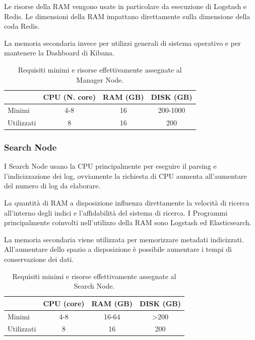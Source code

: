 Le risorse della RAM vengono usate in particolare da esecuzione di Logstash e Redis. Le dimensioni della RAM impattano direttamente sulla dimensione della coda Redis.

La memoria secondaria invece  per utilizzi generali di sistema operativo e per mantenere la Dashboard di Kibana.


\begin{table}[hbtp]
    \centering
    \begin{tabular}{|l|c|c|c|}
        \hline
        & CPU (N. core) & RAM (GB) & DISK (GB) \\
        \hline
        Minimi     & 4-8 & 16 & 200-1000   \\
        \hline
        Utilizzati & 8   & 16  & 200 \\
        \hline
    \end{tabular}
    \caption{Requisiti minimi e risorse effettivamente assegnate al Manager Node.}
    \label{tab:requisitiHw1}
\end{table}


\subsubsection*{Search Node}

I Search Node usano la CPU principalmente per eseguire il parsing e l'indicizzazione dei log, ovviamente la richiesta di CPU aumenta all'aumentare del numero di log da elaborare.

La quantità di RAM a disposizione influenza direttamente la velocità di ricerca all'interno degli indici e l'affidabilità del sistema di ricerca. I Programmi principalmente coinvolti nell'utilizzo della RAM sono Logstash ed Elasticsearch.

La memoria secondaria viene utilizzata per memorizzare metadati indicizzati. All'aumentare dello spazio a disposizione è possibile aumentare i tempi di conservazione dei dati.

\begin{table}[hbtp]
    \centering
    \begin{tabular}{|l|c|c|c|}
        \hline
        & CPU (core) & RAM (GB) & DISK (GB) \\
        \hline
        Minimi     & 4-8 & 16-64 & >200   \\
        \hline
        Utilizzati & 8   & 16  & 200 \\
        \hline
    \end{tabular}
    \caption{Requisiti minimi e risorse effettivamente assegnate al Search Node.}
    \label{tab:requisitiHw2}
\end{table}



